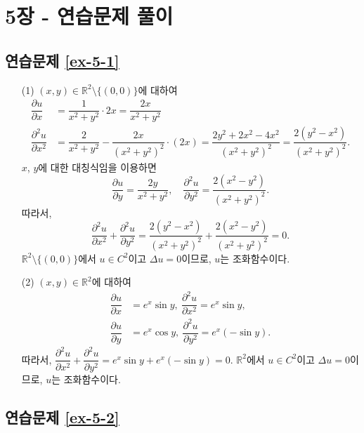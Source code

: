 
\section*{5장 - 연습문제 풀이}

\subsection*{연습문제 \ref{ex-5-1}}

\begin{itemize}
\item[(1)] $(x,y)\in \mathbb R^2\setminus\{(0,0)\}$에 대하여
\begin{align*}
\dfrac{\partial u}{\partial x} &= \dfrac1{x^2+y^2} \cdot 2x = \dfrac{2x}{x^2+y^2} \\
\dfrac{\partial^2 u}{\partial x^2} &= \dfrac2{x^2+y^2} - \dfrac{2x}{(x^2+y^2)^2} \cdot (2x) 
= \dfrac{2y^2+2x^2-4x^2}{(x^2+y^2)^2} = \dfrac{2(y^2-x^2)}{(x^2+y^2)^2}.
\end{align*}
$x$, $y$에 대한 대칭식임을 이용하면
\[
\dfrac{\partial u}{\partial y}  = \dfrac{2y}{x^2+y^2}, \quad
\dfrac{\partial^2 u}{\partial y^2} = \dfrac{2(x^2-y^2)}{(x^2+y^2)^2}.
\]
따라서,
\[
\dfrac{\partial^2 u}{\partial x^2} + \dfrac{\partial^2 u}{\partial y^2}
= \dfrac{2(y^2-x^2)}{(x^2+y^2)^2} + \dfrac{2(x^2-y^2)}{(x^2+y^2)^2} = 0.
\]
$\mathbb R^2\setminus\{(0,0)\}$에서
$u\in C^2$이고 $\Delta u=0$이므로, $u$는 조화함수이다.
\item[(2)] 
$(x,y) \in \mathbb R^2$에 대하여
\begin{align*}
\dfrac{\partial u}{\partial x} &= e^x\sin y, \ \dfrac{\partial^2 u}{\partial x^2} = e^x\sin y, \\
\dfrac{\partial u}{\partial y} &= e^x\cos y, \ \dfrac{\partial^2 u}{\partial y^2} = e^x(-\sin y).
\end{align*}
따라서, 
$\dfrac{\partial^2 u}{\partial x^2} + \dfrac{\partial^2 u}{\partial y^2}
= e^x\sin y + e^x(-\sin y) = 0$.
$\mathbb R^2$에서
$u\in C^2$이고 $\Delta u=0$이므로, $u$는 조화함수이다.
\end{itemize}

\subsection*{연습문제 \ref{ex-5-2}}

